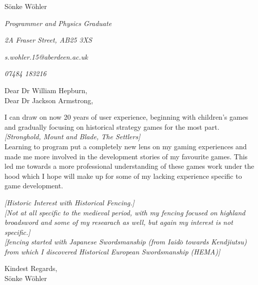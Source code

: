\documentclass[paper=a4,fontsize=11pt]{scrartcl} %
\newcommand{\sepspace}{\vspace*{1em}}		%
\newcommand{\MyName}[1]{ %
  \Huge \usefont{OT1}{phv}{b}{n} \hfill #1
  \par \normalsize \normalfont}
\newcommand{\MySlogan}[5]{ %
  \large \usefont{OT1}{phv}{m}{n}\hfill \textit{#1} 
  \sepspace
  \par \normalsize \usefont{OT1}{phv}{m}{n}\hfill \textit{#2}
  \par \normalsize \usefont{OT1}{phv}{m}{n}\hfill \textit{#3}
  \par \normalsize \usefont{OT1}{phv}{m}{n}\hfill \textit{#4}
  \par \normalsize \usefont{OT1}{phv}{m}{n}\hfill \textit{#5}
  \par \normalsize \normalfont}
\begin{document}
  
  \MyName{S\"onke W\"ohler}
  \MySlogan{Programmer and Physics Graduate}{2A Fraser Street, AB25 3XS}{s.wohler.15@aberdeen.ac.uk}{07484 183216}{}
  \sepspace \sepspace
  
  \noindent
  Dear Dr William Hepburn, \\
  Dear Dr Jackson Armstrong,
  
  \sepspace
  
  \noindent
  I can draw on now 20 years of user experience, beginning with children's games and gradually focusing on historical strategy games for the most part. \\
  \textit{[Stronghold, Mount and Blade, The Settlers]} \\
  Learning to program put a completely new lens on my gaming experiences and made me more involved in the development stories of my favourite games. This led me towards a more professional understanding of these games work under the hood which I hope will make up for some of my lacking experience specific to game development.
  \sepspace
  
  \noindent  
  \textit{[Historic Interest with Historical Fencing.]} \\
  \textit{[Not at all specific to the medieval period, with my fencing focused on highland broadsword and some of my researach as well, but again my interest is not specific.]} \\
  \textit{[fencing started with Japanese Swordsmanship (from Iaid$\bar o$ towards Kendjiutsu) from which I discovered Historical European Swordsmanship (HEMA)]}
  
  


  \sepspace
  
  \noindent
  Kindest Regards, \\
  S\"onke W\"ohler
  
  
  
\end{document}
